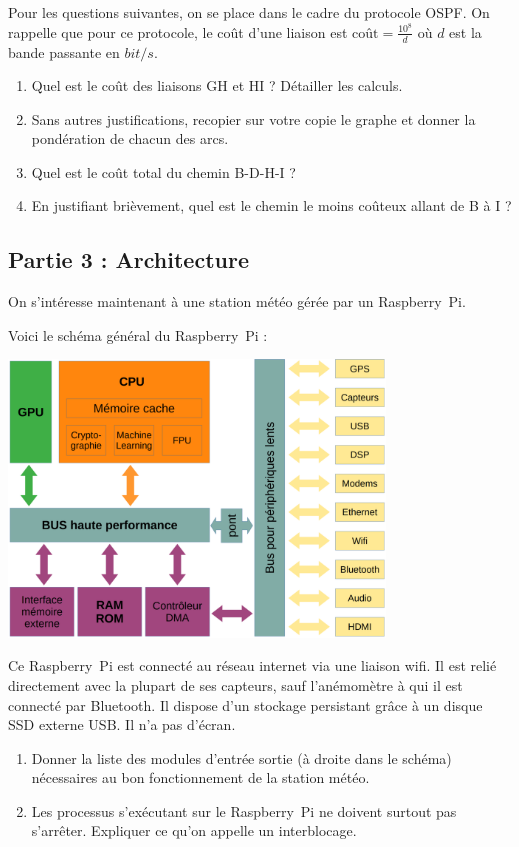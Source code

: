 \documentclass[11pt,a4paper,french,twoside]{PMCours}
\begin{document}
Pour les questions suivantes, on se place dans le cadre du protocole OSPF.
On rappelle que pour ce protocole, le coût d'une liaison est 
$\text{coût}=\frac{10^8}{d}$ où $d$ est la bande passante en $bit/s$.
\begin{enumerate}
    \item Quel est le coût des liaisons GH et HI ? Détailler les calculs.
    \item Sans autres justifications, recopier sur votre copie le graphe et donner la pondération de chacun des arcs. 
    \item Quel est le coût total du chemin B-D-H-I ?
    \item En justifiant brièvement, quel est le chemin le moins coûteux allant de B à I ?
\end{enumerate}

\subsection*{Partie 3 : Architecture}
On s'intéresse maintenant à une station météo gérée par un Raspberry~Pi. 

Voici le schéma général du Raspberry~Pi :
\begin{center}
    \includegraphics[width=10cm]{SchemaSoc.png}
\end{center}

Ce Raspberry~Pi est connecté au réseau internet via une liaison wifi. Il est 
relié directement avec la plupart de ses capteurs, sauf l'anémomètre à qui il 
est connecté par Bluetooth. Il dispose d'un stockage persistant grâce à un
disque SSD externe USB. Il n'a pas d'écran.  

\begin{enumerate}
    \item Donner la liste des modules d'entrée sortie (à droite dans le schéma) 
    nécessaires au bon fonctionnement de la station météo.
    \item Les processus s'exécutant sur le Raspberry~Pi ne doivent surtout pas
    s'arrêter. Expliquer ce qu'on appelle un interblocage.
\end{enumerate}
\end{document}
